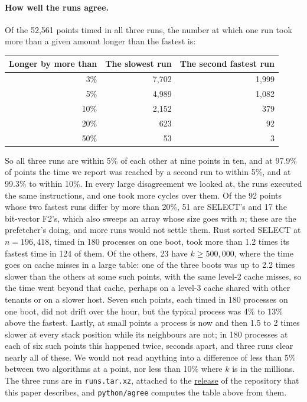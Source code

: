 \documentclass[letterpaper,11pt]{article}
\begin{document}
\paragraph{How well the runs agree.} Of the 52,561 points timed in all
three runs, the number at which one run took more than a given amount
longer than the fastest is:

\begin{center}
    \small
    \begin{tabular}{r|r|r}
    Longer by more than & The slowest run & The second fastest run \\
    \hline
    3\% & 7,702 & 1,999 \\
    5\% & 4,989 & 1,082 \\
    10\% & 2,152 & 379 \\
    20\% & 623 & 92 \\
    50\% & 53 & 3
    \end{tabular}
\end{center}

So all three runs are within 5\% of each other at nine points in ten,
and at 97.9\% of points the time we report was reached by a second run
to within 5\%, and at 99.3\% to within 10\%. In every large
disagreement we looked at, the runs executed the same instructions, and
one took more cycles over them. Of the 92 points whose two fastest runs
differ by more than 20\%, 51 are SELECT's and 17 the bit-vector F2's,
which also sweeps an array whose size goes with \(n\); these are the
prefetcher's doing, and more runs would not settle them. Rust sorted
SELECT at \(n = 196{,}418\), timed in 180 processes on one boot, took
more than 1.2 times its fastest time in 124 of them. Of the others, 23
have \(k \geq 500{,}000\), where the time goes on cache misses in a
large table: one of the three boots was up to 2.2 times slower than the
others at some such points, with the same level-2 cache misses, so the
time went beyond that cache, perhaps on a level-3 cache shared with
other tenants or on a slower host. Seven such points, each timed in 180
processes on one boot, did not drift over the hour, but the typical
process was 4\% to 13\% above the fastest. Lastly, at small points a
process is now and then 1.5 to 2 times slower at every stack position
while its neighbours are not; in 180 processes at each of six such
points this happened twice, seconds apart, and three runs clear nearly
all of these. We would not read anything into a difference of less than
5\% between two algorithms at a point, nor less than 10\% where \(k\)
is in the millions. The three runs are in \texttt{runs.tar.xz}, attached
to the
\href{https://github.com/ciphergoth/sansreplace/releases/tag/paper_v1}{release}
of the repository that this paper describes, and \texttt{python/agree}
computes the table above from them.
\end{document}
